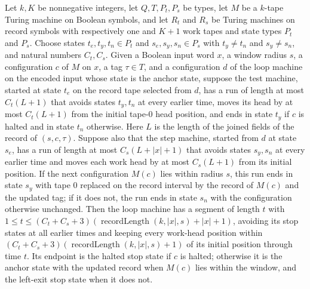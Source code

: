 \begin{theorem}
\label{Turing.wl_round}
\leanok
{}
Let $k,K$ be nonnegative integers, let $Q,T,P_t,P_s$ be types, let $M$ be a $k$-tape
Turing machine on Boolean symbols, and let $R_t$ and $R_s$ be Turing machines on record
symbols with respectively one and $K+1$ work tapes and state types $P_t$ and $P_s$.
Choose states $t_e,t_y,t_n\in P_t$ and $s_e,s_y,s_n\in P_s$ with $t_y\ne t_n$ and
$s_y\ne s_n$, and natural numbers $C_t,C_s$. Given a Boolean input word $x$, a window
radius $s$, a configuration $c$ of $M$ on $x$, a tag $\tau\in T$, and a configuration
$d$ of the loop machine on the encoded input whose state is the anchor state, suppose
the test machine, started at state $t_e$ on the record tape selected from $d$, has a run
of length at most $C_t(L+1)$ that avoids states $t_y,t_n$ at every earlier time, moves
its head by at most $C_t(L+1)$ from the initial tape-$0$ head position, and ends in
state $t_y$ if $c$ is halted and in state $t_n$ otherwise. Here $L$ is the length of the
joined fields of the record of $(s,c,\tau)$. Suppose also that the step machine, started
from $d$ at state $s_e$, has a run of length at most $C_s(L+|x|+1)$ that avoids states
$s_y,s_n$ at every earlier time and moves each work head by at most $C_s(L+1)$ from its
initial position. If the next configuration $M(c)$ lies within radius $s$, this run ends
in state $s_y$ with tape $0$ replaced on the record interval by the record of $M(c)$ and
the updated tag; if it does not, the run ends in state $s_n$ with the configuration
otherwise unchanged. Then the loop machine has a segment of length $t$ with $1\le
t\le(C_t+C_s+3)(\operatorname{recordLength}(k,|x|,s)+|x|+1)$, avoiding its stop states
at all earlier times and keeping every work-head position within
$(C_t+C_s+3)(\operatorname{recordLength}(k,|x|,s)+1)$ of its initial position through
time $t$. Its endpoint is the halted stop state if $c$ is halted; otherwise it is the
anchor state with the updated record when $M(c)$ lies within the window, and the
left-exit stop state when it does not.
\end{theorem}

